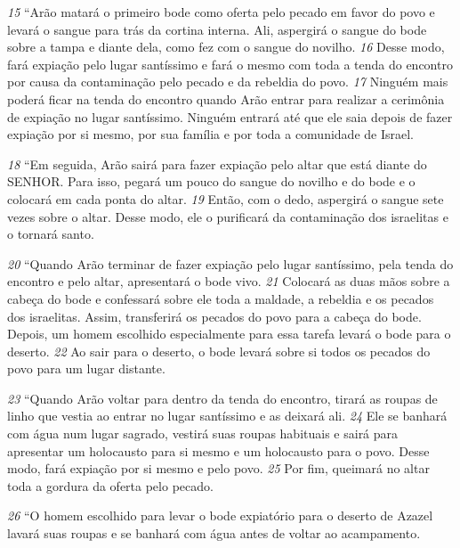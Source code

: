 \textit{\tiny 15}
“Arão matará o primeiro bode como oferta pelo pecado em favor do povo e
levará o sangue para trás da cortina interna. Ali, aspergirá o sangue do bode sobre
a tampa e diante dela, como fez com o sangue do novilho. 
\textit{\tiny 16}
Desse modo, fará
expiação pelo lugar santíssimo e fará o mesmo com toda a tenda do encontro por
causa da contaminação pelo pecado e da rebeldia do povo. 
\textit{\tiny 17}
Ninguém mais
poderá ficar na tenda do encontro quando Arão entrar para realizar a cerimônia
de expiação no lugar santíssimo. Ninguém entrará até que ele saia depois de fazer
expiação por si mesmo, por sua família e por toda a comunidade de Israel.
   
\textit{\tiny 18}
“Em seguida, Arão sairá para fazer expiação pelo altar que está diante do
SENHOR. Para isso, pegará um pouco do sangue do novilho e do bode e o colocará
em cada ponta do altar. 
\textit{\tiny 19}
Então, com o dedo, aspergirá o sangue sete vezes sobre
o altar. Desse modo, ele o purificará da contaminação dos israelitas e o tornará
santo.
   
\textit{\tiny 20}
“Quando Arão terminar de fazer expiação pelo lugar santíssimo, pela tenda
do encontro e pelo altar, apresentará o bode vivo. 
\textit{\tiny 21}
Colocará as duas mãos sobre a
cabeça do bode e confessará sobre ele toda a maldade, a rebeldia e os pecados dos
israelitas. Assim, transferirá os pecados do povo para a cabeça do bode. Depois,
um homem escolhido especialmente para essa tarefa levará o bode para o
deserto. 
\textit{\tiny 22}
Ao sair para o deserto, o bode levará sobre si todos os pecados do povo
para um lugar distante.
   
\textit{\tiny 23}
“Quando Arão voltar para dentro da tenda do encontro, tirará as roupas de
linho que vestia ao entrar no lugar santíssimo e as deixará ali. 
\textit{\tiny 24}
Ele se banhará
com água num lugar sagrado, vestirá suas roupas habituais e sairá para apresentar
um holocausto para si mesmo e um holocausto para o povo. Desse modo, fará
expiação por si mesmo e pelo povo. 
\textit{\tiny 25}
Por fim, queimará no altar toda a gordura
da oferta pelo pecado.
   
\textit{\tiny 26}
“O homem escolhido para levar o bode expiatório para o deserto de Azazel
lavará suas roupas e se banhará com água antes de voltar ao acampamento.
   
